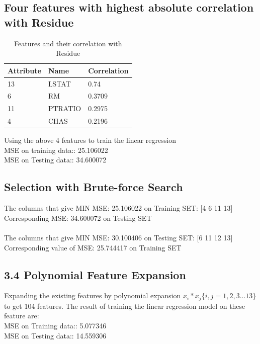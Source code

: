\documentclass[12pt]{article}
\begin{document}
\subsection{ Four features with highest absolute correlation with Residue}
\begin{table}[h]
\centering
\caption{Features and their correlation with Residue }
\label{corr_residue}
\begin{tabular}{|l|l|l|}
\hline
\textbf{Attribute} & \textbf{Name} & \textbf{Correlation} \\ \hline
13                 & LSTAT         & 0.74                 \\ \hline
6                  & RM            & 0.3709               \\ \hline
11                 & PTRATIO       & 0.2975               \\ \hline
4                  & CHAS          & 0.2196               \\ \hline
\end{tabular}
\end{table}
Using the above 4 features to train the linear regression\\
MSE on training data:: 25.106022\\
MSE on Testing data:: 34.600072\\
\subsection*{Selection with Brute-force Search}
The columns that give MIN MSE: 25.106022 on Training SET: [4     6    11    13]\\
Corresponding MSE: 34.600072 on Testing SET\\
\\The columns that give MIN MSE: 30.100406 on Testing SET: [6    11    12    13]\\
Corresponding value of MSE: 25.744417 on Training SET\\
\subsection*{3.4 Polynomial Feature Expansion}
Expanding the existing features by polynomial expansion $x_i * x_j \{i,j=1, 2, 3 ... 13\}$ to get 104 features.
The result of training the linear regression model on these feature are:\\
MSE on Training data:: 5.077346\\
MSE on Testing data:: 14.559306\\
\end{document}
